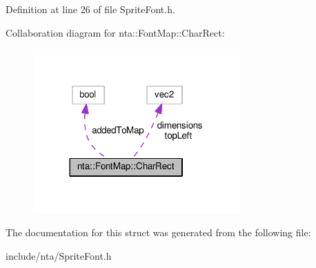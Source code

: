 Definition at line 26 of file Sprite\+Font.\+h.



Collaboration diagram for nta\+:\+:Font\+Map\+:\+:Char\+Rect\+:
\nopagebreak
\begin{figure}[H]
\begin{center}
\leavevmode
\includegraphics[width=225pt]{de/df1/structnta_1_1FontMap_1_1CharRect__coll__graph}
\end{center}
\end{figure}


The documentation for this struct was generated from the following file\+:\begin{DoxyCompactItemize}
\item 
include/nta/Sprite\+Font.\+h\end{DoxyCompactItemize}
